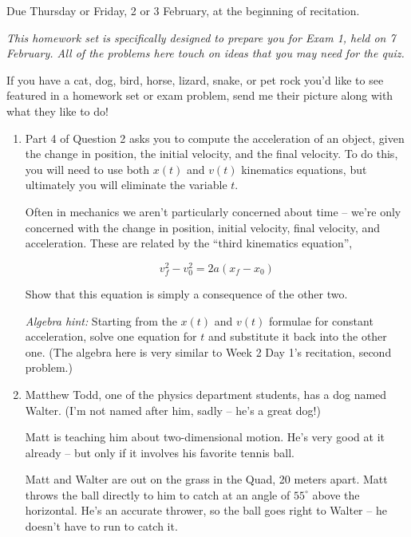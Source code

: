 \documentclass[12pt]{article}
\begin{document}
\Large
\centerline{}


\begin{center} \normalsize Due Thursday or Friday, 2 or 3 February, at the beginning of recitation. 
\end{center}
\normalsize

\it This homework set is specifically designed to prepare you for Exam 1, held on 7 February. All of the problems here touch on ideas that you may need for the quiz. 

If you have a cat, dog, bird, horse, lizard, snake, or pet rock you'd like to see featured in a homework set or exam problem, send me their picture along with what they like to do!

\rm
\begin{enumerate}

\item Part 4 of Question 2 asks you to compute the acceleration of an object, given the change in position, the initial velocity, and the final velocity. To do this, you will need to use both $x(t)$ and $v(t)$ kinematics equations, but ultimately you will eliminate the variable $t$.

Often in mechanics we aren't particularly concerned about time -- we're only concerned with the change in position, initial velocity, final velocity, and acceleration.
These are related by the ``third kinematics equation'', 

$$
v_f^2 - v_0^2 = 2a(x_f - x_0)
$$

Show that this equation is simply a consequence of the other two.

{\it Algebra hint:} Starting from the $x(t)$ and $v(t)$ formulae for constant acceleration, solve one equation for $t$ and substitute it back into the other one. (The algebra here is very similar to Week 2 Day 1's recitation, second problem.)

\bigskip

\item Matthew Todd, one of the physics department students, has a dog named Walter. (I'm not named after him, sadly -- he's a great dog!) 

\begin{minipage}{0.55\textwidth}Matt is teaching him about two-dimensional motion. He's very good at it already -- but only if it involves his favorite tennis ball.

\bigskip

Matt and Walter are out on the grass in the Quad, 20 meters apart. Matt throws the ball directly to him to catch at an angle of $55^\circ$ above the horizontal. He's an accurate thrower, so the ball goes right to Walter -- he doesn't have to run to catch it. 


\end{minipage}
\end{enumerate}
\end{document}
